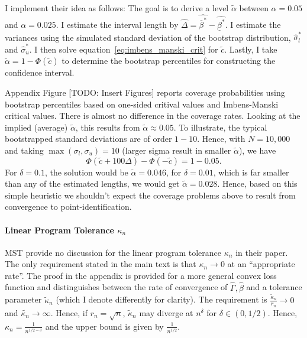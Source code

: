 \documentclass[12pt,a4paper,english]{article} %
\numberwithin{equation}{section}
\theoremstyle{definition}
\theoremstyle{remark}
\theoremstyle{plain}
\begin{document}
I implement their idea as follows:
The goal is to derive a level $\tilde{\alpha}$ between $\alpha = 0.05$ and $\alpha = 0.025$.
I estimate the interval length by $\hat{\Delta} = \hat{\overline{\beta}^*} - \hat{\underline{\beta}^*}$.
I estimate the variances using the simulated standard deviation of the bootstrap distribution, $\hat{\sigma}_l^*$ and $\hat{\sigma}_u^*$.
I then solve equation~\ref{eq:imbens_manski_crit} for $\tilde{c}$.
Lastly, I take $\tilde{\alpha} = 1 - \Phi(\tilde{c})$ to determine the bootstrap percentiles for constructing the confidence interval.

Appendix Figure [TODO: Insert Figures] reports coverage probabilities using bootstrap percentiles based on one-sided critival values and Imbens-Manski critical values.
There is almost no difference in the coverage rates.
Looking at the implied (average) $\tilde{\alpha}$, this results from $\tilde{\alpha} \approx 0.05$.
To illustrate, the typical bootstrapped standard deviations are of order $1-10$.
Hence, with $N = 10,000$ and taking $\max(\sigma_l, \sigma_u)=10$ (larger sigma result in smaller $\tilde{\alpha}$), we have
\begin{equation*}
  \Phi\left(\tilde{c} + 100\Delta\right) - \Phi\left(-\tilde{c}\right) = 1 - 0.05.
\end{equation*}
For $\delta=0.1$, the solution would be $\tilde{\alpha} = 0.046$, for $\delta=0.01$, which is far smaller than any of the estimated lengths, we would get $\tilde{\alpha} = 0.028$.
Hence, based on this simple heuristic we shouldn't expect the coverage problems above to result from convergence to point-identification.


\paragraph{Linear Program Tolerance $\kappa_n$}
MST provide no discussion for the linear program tolerance $\kappa_n$ in their paper.
The only requirement stated in the main text is that $\kappa_n \to 0$ at an ``appropriate rate''.
The proof in the appendix is provided for a more general convex loss function and distinguishes between the rate of convergence of $\hat{\Gamma}, \hat{\beta}$ and a tolerance parameter $\tilde{\kappa}_n$ (which I denote differently for clarity).
The requirement is $\frac{\tilde{\kappa}_n}{r_n} \to 0$ and $\tilde{\kappa_n}\to \infty$. Hence, if $r_n = \sqrt{n}$, $\tilde{\kappa}_n$ may diverge at $n^\delta$ for $\delta \in (0, 1/2)$.
Hence, $\kappa_n = \frac{1}{n^{1/2 - \delta}}$ and the upper bound is given by $\frac{1}{n^{1/2}}$.
\end{document}
